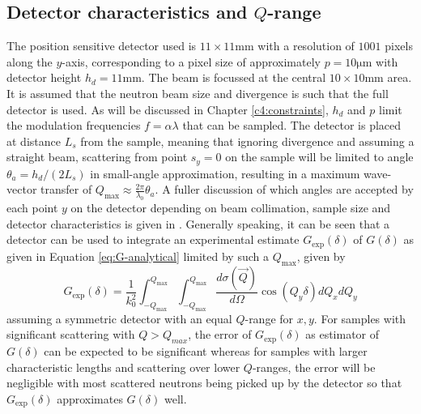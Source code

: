 \documentclass{article}
\begin{document}
\subsection{Detector characteristics and $Q$-range}
\label{c3.4}
The position sensitive detector used is $11\times11\unit{\milli\meter}$ with a resolution of $1001$ pixels along the $y$-axis, corresponding to a pixel size of approximately $p = 10\unit{\micro\meter}$ with detector height $h_d = 11\unit{\milli\meter}$. The beam is focussed at the central $10\times10\unit{\milli\meter}$ area. It is assumed that the neutron beam size and divergence is such that the full detector is used. As will be discussed in Chapter \ref{c4:constraints}, $h_d$ and $p$ limit the modulation frequencies $f = \alpha\lambda$ that can be sampled. The detector is placed at distance $L_s$ from the sample, meaning that ignoring divergence and assuming a straight beam, scattering from point $s_y = 0$ on the sample will be limited to angle $\theta_a = h_d/(2L_s)$ in small-angle approximation, resulting in a maximum wave-vector transfer of $Q_\text{max} \approx \frac{2\pi}{\lambda_0}\theta_a$. A fuller discussion of which angles are accepted by each point $y$ on the detector depending on beam collimation, sample size and detector characteristics is given in \cite{kusmin2017}. Generally speaking, it can be seen that a detector can be used to integrate an experimental estimate $G_\text{exp}(\delta)$ of $G(\delta)$ as given in Equation \eqref{eq:G-analytical} limited by such a $Q_\text{max}$, given by 
\begin{equation}
	G_\text{exp}(\delta) = \frac{1}{k_0^2}\int_{-Q_\text{max}}^{Q_\text{max}}\int_{-Q_\text{max}}^{Q_\text{max}}\dfrac{d\sigma(\vec{Q})}{d\Omega}\cos(Q_y \delta)dQ_xdQ_y  \label{eq:G-experimental}
\end{equation}
assuming a symmetric detector with an equal $Q$-range for $x,y$. For samples with significant scattering with $Q > Q_{max}$, the error of $G_\text{exp}(\delta)$ as estimator of $G(\delta)$ can be expected to be significant whereas for samples with larger characteristic lengths and scattering over lower $Q$-ranges, the error will be negligible with most scattered neutrons being picked up by the detector \cite{rekveldt1996} so that $G_\text{exp}(\delta)$ approximates $G(\delta)$ well. 

\end{document}
